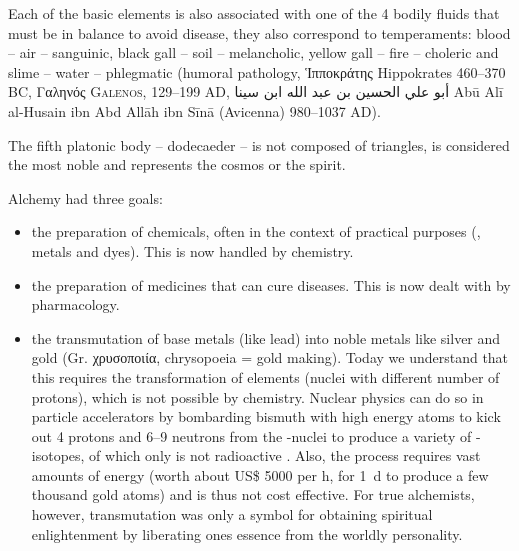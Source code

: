 \documentclass[notitlepage,british]{scrartcl}
\begin{document}
\begin{refsection}
Each of the basic elements is also associated with one of the 4 bodily fluids that must be in balance to avoid disease, they also correspond to temperaments: blood -- air -- sanguinic, black gall -- soil -- melancholic, yellow gall -- fire -- choleric and slime -- water -- phlegmatic (humoral pathology, \foreignlanguage{greek}{Ἱπποκράτης} Hippokrates \num{460}--\num{370} BC, \foreignlanguage{greek}{Γαληνός} \textsc{Galenos}, \num{129}--\num{199} AD, \foreignlanguage{arabic}{أبو علي الحسين بن عبد الله ابن سينا} Abū Alī al-Husain ibn Abd Allāh ibn Sīnā (Avicenna) \num{980}--\num{1037} AD).

The fifth platonic body -- dodecaeder -- is not composed of triangles, is considered the most noble and represents the cosmos or the spirit.

Alchemy had three goals:
\begin{itemize}
  \item{the preparation of chemicals, often in the context of practical purposes (, metals and dyes). This is now handled by chemistry.}
  \item{the preparation of medicines that can cure diseases. This is now dealt with by pharmacology.}
  \item{the transmutation of base metals (like lead) into noble metals like silver and gold (Gr. \foreignlanguage{greek}{χρυσοποιία}, chrysopoeia = gold making). Today we understand that this requires the transformation of elements (nuclei with different number of protons), which is not possible by chemistry. Nuclear physics can do so in particle accelerators by bombarding bismuth with high energy atoms to kick out \num{4} protons and \num{6}--\num{9} neutrons from the -nuclei to produce a variety of -isotopes, of which only  is not radioactive \parencite{Ale-81}. Also, the process requires vast amounts of energy (worth about US\$ \num{5000} per \si{h}, for \SI{1}{d} to produce a few thousand gold atoms) and is thus not cost effective. For true alchemists, however, transmutation was only a symbol for obtaining spiritual enlightenment by liberating ones essence from the worldly personality.}
\end{itemize}


\end{refsection}
\end{document}
